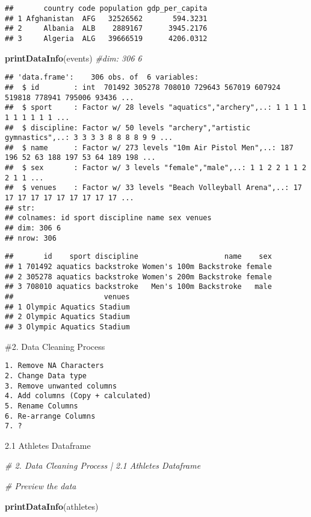 \documentclass[]{article}
\newenvironment{Shaded}{\begin{snugshade}}{\end{snugshade}}
\newcommand{\CommentTok}[1]{\textcolor[rgb]{0.56,0.35,0.01}{\textit{#1}}}
\newcommand{\KeywordTok}[1]{\textcolor[rgb]{0.13,0.29,0.53}{\textbf{#1}}}
\newcommand{\NormalTok}[1]{#1}
\begin{document}
\begin{verbatim}
##       country code population gdp_per_capita
## 1 Afghanistan  AFG   32526562       594.3231
## 2     Albania  ALB    2889167      3945.2176
## 3     Algeria  ALG   39666519      4206.0312
\end{verbatim}

\begin{Shaded}
\begin{Highlighting}[]
  \KeywordTok{printDataInfo}\NormalTok{(events) }\CommentTok{#dim: 306 6 }
\end{Highlighting}
\end{Shaded}

\begin{verbatim}
## 'data.frame':    306 obs. of  6 variables:
##  $ id        : int  701492 305278 708010 729643 567019 607924 519818 778941 795006 93436 ...
##  $ sport     : Factor w/ 28 levels "aquatics","archery",..: 1 1 1 1 1 1 1 1 1 1 ...
##  $ discipline: Factor w/ 50 levels "archery","artistic gymnastics",..: 3 3 3 3 8 8 8 8 9 9 ...
##  $ name      : Factor w/ 273 levels "10m Air Pistol Men",..: 187 196 52 63 188 197 53 64 189 198 ...
##  $ sex       : Factor w/ 3 levels "female","male",..: 1 1 2 2 1 1 2 2 1 1 ...
##  $ venues    : Factor w/ 33 levels "Beach Volleyball Arena",..: 17 17 17 17 17 17 17 17 17 17 ...
## str: 
## colnames: id sport discipline name sex venues 
## dim: 306 6 
## nrow: 306
\end{verbatim}

\begin{verbatim}
##       id    sport discipline                    name    sex
## 1 701492 aquatics backstroke Women's 100m Backstroke female
## 2 305278 aquatics backstroke Women's 200m Backstroke female
## 3 708010 aquatics backstroke   Men's 100m Backstroke   male
##                     venues
## 1 Olympic Aquatics Stadium
## 2 Olympic Aquatics Stadium
## 3 Olympic Aquatics Stadium
\end{verbatim}

\#2. Data Cleaning Process

\begin{verbatim}
1. Remove NA Characters
2. Change Data type 
3. Remove unwanted columns
4. Add columns (Copy + calculated)
5. Rename Columns
6. Re-arrange Columns
7. ?
\end{verbatim}

2.1 Athletes Dataframe

\begin{Shaded}
\begin{Highlighting}[]
\CommentTok{# 2. Data Cleaning Process | 2.1 Athletes Dataframe}

\CommentTok{#   Preview the data}
    
    \KeywordTok{printDataInfo}\NormalTok{(athletes)}
\end{Highlighting}
\end{Shaded}
\end{document}
